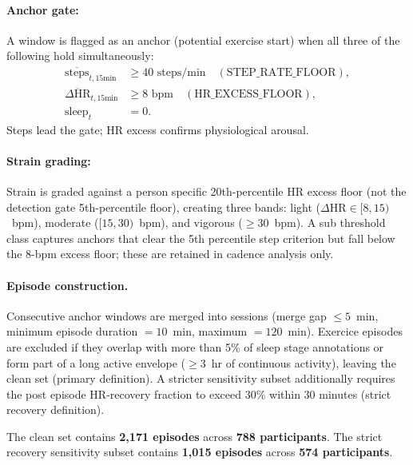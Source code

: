 \paragraph{Anchor gate:}
A window is flagged as an anchor (potential exercise start) when all three
of the following hold simultaneously:
\begin{align}
  \overline{\mathrm{steps}}_{t,15\text{min}} &\geq 40 \text{ steps/min} \quad (\text{STEP\_RATE\_FLOOR}), \label{eq:gate_steps} \\
  \overline{\Delta\mathrm{HR}}_{t,15\text{min}} &\geq 8 \text{ bpm}    \quad (\text{HR\_EXCESS\_FLOOR}), \label{eq:gate_hr} \\
  \mathrm{sleep}_{t}                            &= 0.                  \label{eq:gate_wake}
\end{align}
Steps lead the gate; HR excess confirms physiological arousal.

\paragraph{Strain grading: }
Strain is graded against a person specific 20th-percentile HR excess floor
(not the detection gate 5th-percentile floor), creating three bands:
light ($\Delta\mathrm{HR} \in [8, 15)$~bpm), moderate ($[15, 30)$~bpm),
and vigorous ($\geq\!30$~bpm).
A sub threshold class captures anchors that clear the 5th percentile step
criterion but fall below the 8-bpm excess floor; these are retained in
cadence analysis only.


\label{subsec:ex_episodes}
\paragraph{Episode construction.}
Consecutive anchor windows are merged into sessions
(merge gap $\leq 5$~min, minimum episode duration $= 10$~min, maximum $= 120$~min).
Exercice episodes are excluded if they overlap with more than 5\% of
sleep stage annotations or form part of a long active envelope
($\geq 3$~hr of continuous activity), leaving the clean set (primary definition).
A stricter sensitivity subset additionally requires the post episode
HR-recovery fraction to exceed 30\% within 30 minutes
(strict recovery definition).

The clean set contains \textbf{2{,}171 episodes} across \textbf{788 participants}.
The strict recovery sensitivity subset contains \textbf{1{,}015 episodes}
across \textbf{574 participants}.

